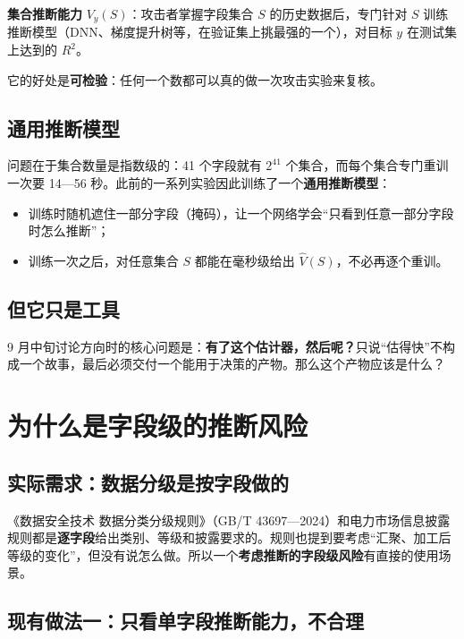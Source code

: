 \documentclass[zihao=-4,a4paper]{ctexart}
\begin{document}
\begin{notebox}
\textbf{集合推断能力} $V_y(S)$：攻击者掌握字段集合 $S$ 的历史数据后，专门针对 $S$ 训练推断模型（DNN、梯度提升树等，在验证集上挑最强的一个），对目标 $y$ 在测试集上达到的 $R^2$。
\end{notebox}

它的好处是\textbf{可检验}：任何一个数都可以真的做一次攻击实验来复核。

\subsection{通用推断模型}

问题在于集合数量是指数级的：41 个字段就有 $2^{41}$ 个集合，而每个集合专门重训一次要 14—56 秒。此前的一系列实验因此训练了一个\textbf{通用推断模型}：

\begin{itemize}[leftmargin=*]
  \item 训练时随机遮住一部分字段（掩码），让一个网络学会“只看到任意一部分字段时怎么推断”；
  \item 训练一次之后，对任意集合 $S$ 都能在毫秒级给出 $\hat V(S)$，不必再逐个重训。
\end{itemize}

\subsection{但它只是工具}

9 月中旬讨论方向时的核心问题是：\textbf{有了这个估计器，然后呢？}只说“估得快”不构成一个故事，最后必须交付一个能用于决策的产物。那么这个产物应该是什么？

\section{为什么是字段级的推断风险}

\subsection{实际需求：数据分级是按字段做的}

《数据安全技术 数据分类分级规则》（GB/T 43697—2024）\cite{gbt43697}和电力市场信息披露规则\cite{nea2024}都是\textbf{逐字段}给出类别、等级和披露要求的。规则也提到要考虑“汇聚、加工后等级的变化”，但没有说怎么做。所以一个\textbf{考虑推断的字段级风险}有直接的使用场景。

\subsection{现有做法一：只看单字段推断能力，不合理}
\end{document}
